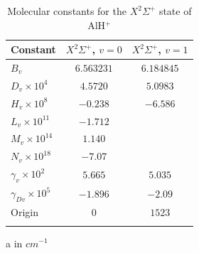 \documentclass[nofootinbib,aip,jcp,reprint]{revtex4-1}
\begin{document}
\begin{center}
\begin{table}
\begin{minipage}[b]{0.45\linewidth}
\let\TPToverlap=\TPTrlap
\caption{Molecular constants for the $X^2\Sigma^+$ state of AlH$^{+}$}
\begin{threeparttable}
\renewcommand{\arraystretch}{1.25}
\setlength{\tabcolsep}{1em}
\begin{tabular}{lcc}
 \hline\colrule
Constant\cite{szajna2011high} &$X^2\Sigma^+$,  $ v=0$   &$X^2\Sigma^+$,  $ v=1$    \\
 \hline\colrule
$B_{v}$                                    &$6.563231$ &$6.184845$   \\   \hline
$D_{v}\times 10^{4}$              &$4.5720$     &$5.0983$      \\ \hline
$H_{v}\times 10^{8}$              &$-0.238$     &$-6.586$       \\ \hline
$L_{v}\times 10^{11}$              &$-1.712$      &                  \\ \hline
$M_{v}\times 10^{14}$            &$1.140$        &                  \\ \hline
$N_{v}\times 10^{18}$             &$-7.07$        &                  \\ \hline
$\gamma_{v}\times 10^{2}$    &$5.665$       &$5.035$        \\ \hline
$\gamma_{Dv}\times 10^{5}$  &$-1.896$     &$-2.09$        \\ \hline
Origin                                         &$0$              &$1523$        \\ 
\botrule
\end{tabular}
\begin{tablenotes}
\item[a] in $cm^{-1}$
\end{tablenotes}
\end{threeparttable}
\label{Xparameters}

\end{minipage}
\hspace{0.2cm}
\begin{minipage}[b]{0.45\linewidth}
\centering


\end{minipage}
\end{table}
\end{center}
\end{document}
